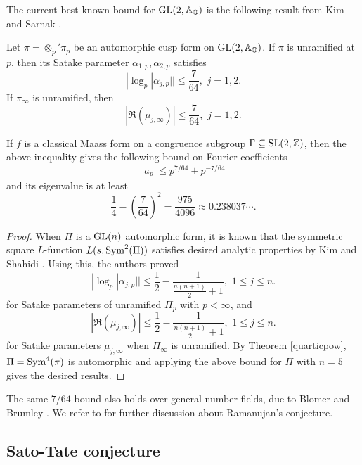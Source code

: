 The current best known bound for $\operatorname{\mathrm{GL}}(2, \mathbb{A}_{\mathbb{Q}})$ is the following result from Kim and Sarnak \cite{kim2003refined}.

\begin{theorem}
Let $\pi = \otimes_{p}'\pi_{p}$ be an automorphic cusp form on $\operatorname{\mathrm{GL}}(2, \mathbb{A}_{\mathbb{Q}})$.
If $\pi$ is unramified at $p$, then its Satake parameter $\alpha_{1, p}, \alpha_{2, p}$ satisfies
$$
|\log_{p}|\alpha_{j, p}|| \leq \frac{7}{64},\,\, j = 1, 2.
$$
If $\pi_{\infty}$ is unramified, then
$$
|\Re(\mu_{j, \infty})|\leq \frac{7}{64},\,\,j = 1, 2.
$$
\end{theorem}
If $f$ is a classical Maass form
on a congruence subgroup $\Gamma \subseteq \operatorname{\mathrm{SL}}(2, \mathbb{Z})$,
then the above inequality gives the following bound on Fourier coefficients
$$
|a_{p}| \leq p^{7/64} + p^{-7/64}
$$
and its eigenvalue is at least
$$
\frac{1}{4} - \left(\frac{7}{64}\right)^{2} = \frac{975}{4096} \approx 0.238037\cdots.
$$
\begin{proof}
When $\Pi$ is a $\operatorname{\mathrm{GL}}(n)$ automorphic form, it is known that the symmetric square $L$-function $L(s, \mathrm{Sym}^{2}(\Pi))$
satisfies desired analytic properties by Kim and Shahidi \cite{kim1999langlands,shahidi1988ramanujan}.
Using this, the authors proved
$$
|\log_{p}|\alpha_{j, p}|| \leq \frac{1}{2} - \frac{1}{\frac{n(n+1)}{2} + 1},\,\, 1\leq j \leq n.
$$
for Satake parameters of unramified $\Pi_{p}$ with $p <\infty$, and
$$
|\Re(\mu_{j, \infty})|\leq \frac{1}{2} - \frac{1}{\frac{n(n+1)}{2} + 1},\,\, 1\leq j \leq n.
$$
for Satake parameters $\mu_{j, \infty}$ when $\Pi_{\infty}$ is unramified.
By Theorem \ref{quarticpow}, $\Pi = \mathrm{Sym}^{4}(\pi)$ is automorphic 
and applying the above bound for $\Pi$ with $n = 5$ gives the desired results.
\end{proof}
The same $7/64$ bound also holds over general number fields, due to Blomer and Brumley \cite{blomer2011ramanujan}.
We refer to \cite{sarnak2005notes,blomer2013role,winnie2020ramanujan} for further discussion
about Ramanujan's conjecture.

\subsection{Sato-Tate conjecture}


